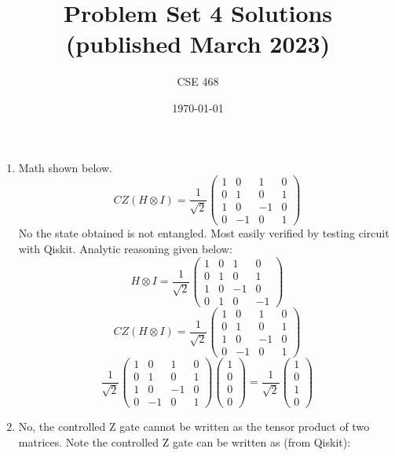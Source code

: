 \documentclass[12pt]{article}
\title{Problem Set 4 Solutions\\(published March 2023)}
\author{CSE 468}
\date{\today}
\begin{document}
\maketitle

\begin{enumerate}[font=\bfseries]
    \item Math shown below.
    \[CZ(H \otimes I) = \frac{1}{\sqrt{2}}
    \begin{pmatrix}
    1 & 0 & 1 & 0 \\
    0 & 1 & 0 & 1 \\
    1 & 0 & -1 & 0 \\
    0 & -1 & 0 & 1
    \end{pmatrix}
    \]
    No the state obtained is not entangled. Most easily verified by testing circuit with Qiskit. Analytic reasoning given below:
    \[H \otimes I = \frac{1}{\sqrt{2}}\begin{pmatrix}
    1 & 0 & 1 & 0 \\
    0 & 1 & 0 & 1 \\
    1 & 0 & -1 & 0 \\
    0 & 1 & 0 & -1
    \end{pmatrix}\]
    \[CZ(H \otimes I) = \frac{1}{\sqrt{2}}
    \begin{pmatrix}
    1 & 0 & 1 & 0 \\
    0 & 1 & 0 & 1 \\
    1 & 0 & -1 & 0 \\
    0 & -1 & 0 & 1
    \end{pmatrix}
    \]
    \[\frac{1}{\sqrt{2}}
    \begin{pmatrix}
    1 & 0 & 1 & 0 \\
    0 & 1 & 0 & 1 \\
    1 & 0 & -1 & 0 \\
    0 & -1 & 0 & 1
    \end{pmatrix}
    \begin{pmatrix}
    1 \\ 0 \\ 0 \\ 0
    \end{pmatrix}
    =
    \frac{1}{\sqrt{2}}
    \begin{pmatrix}
    1 \\ 0 \\ 1 \\ 0
    \end{pmatrix}
    \]
    \item No, the controlled Z gate cannot be written as the tensor product of two matrices. Note the controlled Z gate can be written as (from Qiskit):

\end{enumerate}
\end{document}
